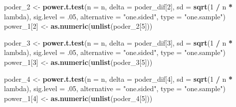 \documentclass[11pt,]{article}
\newenvironment{Shaded}{\begin{snugshade}}{\end{snugshade}}
\newcommand{\DataTypeTok}[1]{\textcolor[rgb]{0.13,0.29,0.53}{#1}}
\newcommand{\DecValTok}[1]{\textcolor[rgb]{0.00,0.00,0.81}{#1}}
\newcommand{\FloatTok}[1]{\textcolor[rgb]{0.00,0.00,0.81}{#1}}
\newcommand{\KeywordTok}[1]{\textcolor[rgb]{0.13,0.29,0.53}{\textbf{#1}}}
\newcommand{\NormalTok}[1]{#1}
\newcommand{\OperatorTok}[1]{\textcolor[rgb]{0.81,0.36,0.00}{\textbf{#1}}}
\newcommand{\StringTok}[1]{\textcolor[rgb]{0.31,0.60,0.02}{#1}}
\begin{document}
\begin{Shaded}
\begin{Highlighting}[]
\NormalTok{  poder_}\DecValTok{2}\NormalTok{ <-}\StringTok{ }\KeywordTok{power.t.test}\NormalTok{(}\DataTypeTok{n =}\NormalTok{ n, }\DataTypeTok{delta =}\NormalTok{ poder_dif[}\DecValTok{2}\NormalTok{],}
                          \DataTypeTok{sd =} \KeywordTok{sqrt}\NormalTok{(}\DecValTok{1} \OperatorTok{/}\StringTok{ }\NormalTok{n }\OperatorTok{*}\StringTok{ }\NormalTok{lambda),}
                          \DataTypeTok{sig.level =} \FloatTok{.05}\NormalTok{,}
                          \DataTypeTok{alternative =} \StringTok{"one.sided"}\NormalTok{,}
                          \DataTypeTok{type =} \StringTok{"one.sample"}\NormalTok{)}
\NormalTok{  power_}\DecValTok{1}\NormalTok{[}\DecValTok{2}\NormalTok{] <-}\StringTok{ }\KeywordTok{as.numeric}\NormalTok{(}\KeywordTok{unlist}\NormalTok{(poder_}\DecValTok{2}\NormalTok{[}\DecValTok{5}\NormalTok{]))}

\NormalTok{  poder_}\DecValTok{3}\NormalTok{ <-}\StringTok{ }\KeywordTok{power.t.test}\NormalTok{(}\DataTypeTok{n =}\NormalTok{ n, }\DataTypeTok{delta =}\NormalTok{ poder_dif[}\DecValTok{3}\NormalTok{],}
                          \DataTypeTok{sd =} \KeywordTok{sqrt}\NormalTok{(}\DecValTok{1} \OperatorTok{/}\StringTok{ }\NormalTok{n }\OperatorTok{*}\StringTok{ }\NormalTok{lambda),}
                          \DataTypeTok{sig.level =} \FloatTok{.05}\NormalTok{,}
                          \DataTypeTok{alternative =} \StringTok{"one.sided"}\NormalTok{,}
                          \DataTypeTok{type =} \StringTok{"one.sample"}\NormalTok{)}
\NormalTok{  power_}\DecValTok{1}\NormalTok{[}\DecValTok{3}\NormalTok{] <-}\StringTok{ }\KeywordTok{as.numeric}\NormalTok{(}\KeywordTok{unlist}\NormalTok{(poder_}\DecValTok{3}\NormalTok{[}\DecValTok{5}\NormalTok{]))}

\NormalTok{  poder_}\DecValTok{4}\NormalTok{ <-}\StringTok{ }\KeywordTok{power.t.test}\NormalTok{(}\DataTypeTok{n =}\NormalTok{ n, }\DataTypeTok{delta =}\NormalTok{ poder_dif[}\DecValTok{4}\NormalTok{],}
                          \DataTypeTok{sd =} \KeywordTok{sqrt}\NormalTok{(}\DecValTok{1} \OperatorTok{/}\StringTok{ }\NormalTok{n }\OperatorTok{*}\StringTok{ }\NormalTok{lambda),}
                          \DataTypeTok{sig.level =} \FloatTok{.05}\NormalTok{,}
                          \DataTypeTok{alternative =} \StringTok{"one.sided"}\NormalTok{,}
                          \DataTypeTok{type =} \StringTok{"one.sample"}\NormalTok{)}
\NormalTok{  power_}\DecValTok{1}\NormalTok{[}\DecValTok{4}\NormalTok{] <-}\StringTok{ }\KeywordTok{as.numeric}\NormalTok{(}\KeywordTok{unlist}\NormalTok{(poder_}\DecValTok{4}\NormalTok{[}\DecValTok{5}\NormalTok{]))}


\end{Highlighting}
\end{Shaded}
\end{document}
